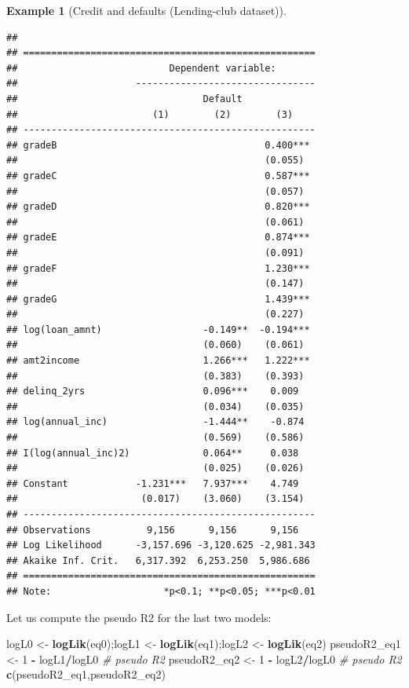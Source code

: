 \documentclass[
  12pt,
]{book}
\newenvironment{Shaded}{\begin{snugshade}}{\end{snugshade}}
\newcommand{\CommentTok}[1]{\textcolor[rgb]{0.56,0.35,0.01}{\textit{#1}}}
\newcommand{\DecValTok}[1]{\textcolor[rgb]{0.00,0.00,0.81}{#1}}
\newcommand{\FunctionTok}[1]{\textcolor[rgb]{0.13,0.29,0.53}{\textbf{#1}}}
\newcommand{\NormalTok}[1]{#1}
\newcommand{\OtherTok}[1]{\textcolor[rgb]{0.56,0.35,0.01}{#1}}
\newcommand{\SpecialCharTok}[1]{\textcolor[rgb]{0.81,0.36,0.00}{\textbf{#1}}}
\theoremstyle{definition}
\theoremstyle{definition}
\newtheorem{example}{Example}[chapter]
\theoremstyle{definition}
\theoremstyle{definition}
\theoremstyle{remark}
\begin{document}
\begin{example}[Credit and defaults (Lending-club dataset)]
\begin{verbatim}
## 
## ====================================================
##                           Dependent variable:       
##                     --------------------------------
##                                 Default             
##                        (1)        (2)        (3)    
## ----------------------------------------------------
## gradeB                                     0.400*** 
##                                            (0.055)  
## gradeC                                     0.587*** 
##                                            (0.057)  
## gradeD                                     0.820*** 
##                                            (0.061)  
## gradeE                                     0.874*** 
##                                            (0.091)  
## gradeF                                     1.230*** 
##                                            (0.147)  
## gradeG                                     1.439*** 
##                                            (0.227)  
## log(loan_amnt)                  -0.149**  -0.194*** 
##                                 (0.060)    (0.061)  
## amt2income                      1.266***   1.222*** 
##                                 (0.383)    (0.393)  
## delinq_2yrs                     0.096***    0.009   
##                                 (0.034)    (0.035)  
## log(annual_inc)                 -1.444**    -0.874  
##                                 (0.569)    (0.586)  
## I(log(annual_inc)2)             0.064**     0.038   
##                                 (0.025)    (0.026)  
## Constant            -1.231***   7.937***    4.749   
##                      (0.017)    (3.060)    (3.154)  
## ----------------------------------------------------
## Observations          9,156      9,156      9,156   
## Log Likelihood      -3,157.696 -3,120.625 -2,981.343
## Akaike Inf. Crit.   6,317.392  6,253.250  5,986.686 
## ====================================================
## Note:                    *p<0.1; **p<0.05; ***p<0.01
\end{verbatim}

Let us compute the pseudo R2 for the last two models:

\begin{Shaded}
\begin{Highlighting}[]
\NormalTok{logL0 }\OtherTok{\textless{}{-}} \FunctionTok{logLik}\NormalTok{(eq0);logL1 }\OtherTok{\textless{}{-}} \FunctionTok{logLik}\NormalTok{(eq1);logL2 }\OtherTok{\textless{}{-}} \FunctionTok{logLik}\NormalTok{(eq2)}
\NormalTok{pseudoR2\_eq1 }\OtherTok{\textless{}{-}} \DecValTok{1} \SpecialCharTok{{-}}\NormalTok{ logL1}\SpecialCharTok{/}\NormalTok{logL0 }\CommentTok{\# pseudo R2}
\NormalTok{pseudoR2\_eq2 }\OtherTok{\textless{}{-}} \DecValTok{1} \SpecialCharTok{{-}}\NormalTok{ logL2}\SpecialCharTok{/}\NormalTok{logL0 }\CommentTok{\# pseudo R2}
\FunctionTok{c}\NormalTok{(pseudoR2\_eq1,pseudoR2\_eq2)}
\end{Highlighting}
\end{Shaded}


\end{example}
\end{document}
